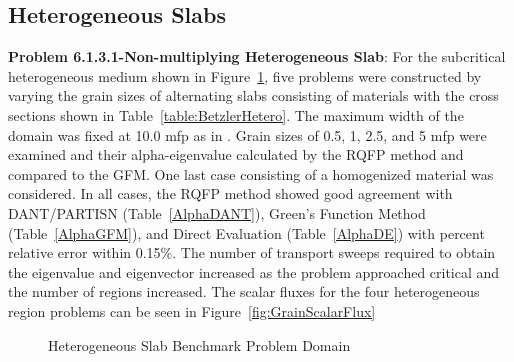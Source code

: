 \clearpage
\subsection{Heterogeneous Slabs}

\textbf{Problem 6.1.3.1-Non-multiplying Heterogeneous Slab}: For the subcritical heterogeneous medium shown in Figure~\ref{fig:HeteroSlabDomain}, five problems were constructed by varying the grain sizes of alternating slabs consisting of materials with the cross sections shown in Table~\ref{table:BetzlerHetero}. The maximum width of the domain was fixed at 10.0 mfp as in \cite{kornreich_timeeigenvalue_2005}. Grain sizes of 0.5, 1, 2.5, and 5 mfp were examined and their alpha-eigenvalue calculated by the RQFP method and compared to the GFM. One last case consisting of a homogenized material was considered. In all cases, the RQFP method showed good agreement with DANT/PARTISN (Table~\ref{AlphaDANT}), Green's Function Method (Table~\ref{AlphaGFM}), and Direct Evaluation (Table~\ref{AlphaDE}) with percent relative error within 0.15\%. The number of transport sweeps required to obtain the eigenvalue and eigenvector increased as the problem approached critical and the number of regions increased. The scalar fluxes for the four heterogeneous region problems can be seen in Figure~\ref{fig:GrainScalarFlux}

\begin{figure}[!htbp]
	\centering
	
	\caption{Heterogeneous Slab Benchmark Problem Domain \cite{kornreich_timeeigenvalue_2005}}
	\label{fig:HeteroSlabDomain}
\end{figure}

